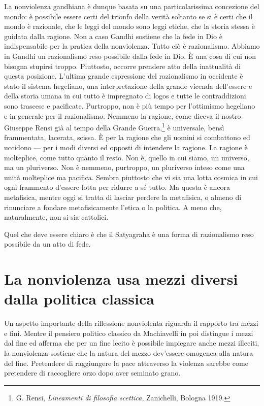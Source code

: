 \documentclass[12pt,oneside,openany]{book}
\begin{document}
La nonviolenza gandhiana è dunque basata su una particolarissima concezione del mondo: è possibile essere certi del trionfo della verità soltanto se si è certi che il mondo è razionale, che le leggi del mondo sono leggi etiche, che la storia stessa è guidata dalla ragione. Non a caso Gandhi sostiene che la fede in Dio è indispensabile per la pratica della nonviolenza. Tutto ciò è razionalismo. Abbiamo in Gandhi un razionalismo reso possibile dalla fede in Dio. È una cosa di cui non bisogna stupirsi troppo. Piuttosto, occorre prendere atto della inattualità di questa posizione. L'ultima grande espressione del razionalismo in occidente è stato il sistema hegeliano, una interpretazione della grande vicenda dell'essere e della storia umana in cui tutto è impregnato di logos e tutte le contraddizioni sono trascese e pacificate. Purtroppo, non è più tempo per l'ottimismo hegeliano e in generale per il razionalismo. Nemmeno la ragione, come diceva il nostro Giuseppe Rensi già al tempo della Grande Guerra,\footnote{G. Rensi, \emph{Lineamenti di filosofia scettica}, Zanichelli, Bologna 1919.} è universale, bensì frammentata, lacerata, scissa. È per la ragione che gli uomini si combattono ed uccidono --- per i modi diversi ed opposti di intendere la ragione. La ragione è molteplice, come tutto quanto il resto. Non è, quello in cui siamo, un universo, ma un pluriverso. Non è nemmeno, purtroppo, un pluriverso inteso come una unità molteplice ma pacifica. Sembra piuttosto che vi sia una lotta cosmica in cui ogni frammento d'essere lotta per ridurre a sé tutto. Ma questa è ancora metafisica, mentre oggi si tratta di lasciar perdere la metafisica, o almeno di rinunciare a fondare metafisicamente l'etica o la politica. A meno che, naturalmente, non si sia cattolici.



Quel che deve essere chiaro è che il Satyagraha è una forma di razionalismo reso possibile da un atto di fede.

\setcounter{chapter}{2}\addtocounter{chapter}{-1}

\chapter{La nonviolenza usa mezzi diversi dalla politica classica}

Un aspetto importante della riflessione nonviolenta riguarda il rapporto tra mezzi e fini. Mentre il pensiero politico classico da Machiavelli in poi distingue i mezzi dal fine ed afferma che per un fine lecito è possibile impiegare anche mezzi illeciti, la nonviolenza sostiene che la natura del mezzo dev'essere omogenea alla natura del fine. Pretendere di raggiungere la pace attraverso la violenza sarebbe come pretendere di raccogliere orzo dopo aver seminato grano.
\end{document}

